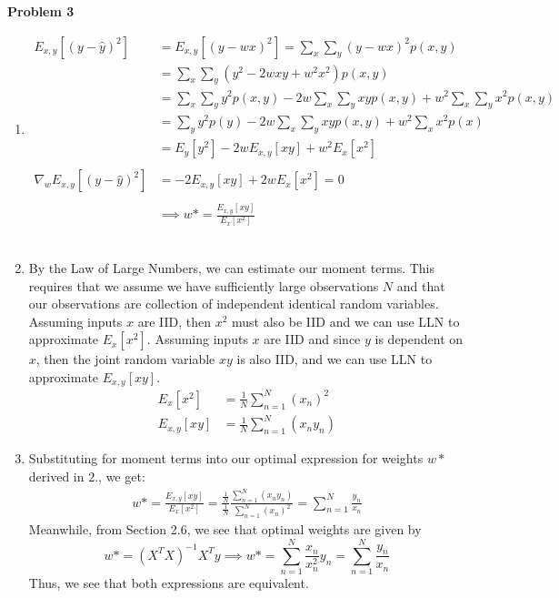 \documentclass[submit]{harvardml}
\begin{document}
\newpage
\textbf{Problem 3}
\begin{enumerate}
    \item 
    \begin{align}
        E_{x,y}[(y-\hat{y})^2] &= E_{x,y}[(y-wx)^2] = \sum_x \sum_y (y - wx)^2 p(x,y) \\
        &=\sum_x \sum_y (y^2 - 2wxy+w^2x^2)p(x,y) \\
        &= \sum_x\sum_y y^2 p(x,y) - 2w\sum_x\sum_y xy p(x,y) +w^2\sum_x\sum_y x^2p(x,y) \\
        &= \sum_y y^2 p(y) - 2w\sum_x\sum_y xy p(x,y) + w^2 \sum_x x^2 p(x) \\
        &= E_y[y^2] - 2wE_{x,y}[xy] + w^2E_x[x^2]  \\ \\
        \nabla_w E_{x,y}[(y-\hat{y})^2] &= -2 E_{x,y}[xy] + 2wE_x[x^2] = 0 \\ \\
        &\implies w* = \frac{E_{x,y}[xy]}{E_x[x^2]}
    \end{align}
    \\
   
    
    \item  By the Law of Large Numbers, we can estimate our moment terms. This requires that we assume we have sufficiently large observations $N$ and that our observations are collection of independent identical random variables. Assuming inputs $x$ are IID, then $x^2$ must also be IID and we can use LLN to approximate $E_x[x^2]$. Assuming inputs $x$ are IID and since $y$ is dependent on $x$, then the joint random variable $xy$ is also IID, and we can use LLN to approximate $E_{x,y}[xy]$. 
    \begin{align}
        E_x[x^2] &= \frac{1}{N}\sum_{n=1}^N (x_n)^2  \\
        E_{x,y}[xy] &= \frac{1}{N} \sum_{n=1}^N (x_n y_n) 
    \end{align}
    
    
    \item  Substituting for moment terms into our optimal expression for weights $w*$ derived in $2.$, we get:
    \begin{align}
        w* = \frac{E_{x,y}[xy]}{E_x[x^2]} = \frac{\frac{1}{N}}{\frac{1}{N}} \frac{\sum_{n=1}^N (x_n y_n)}{\sum_{n=1}^N (x_n)^2} = \sum_{n=1}^N \frac{y_n}{x_n} 
    \end{align}
    Meanwhile, from Section 2.6, we see that optimal weights are given by 
    $$w* = (X^TX)^{-1} X^Ty \implies w* = \sum_{n=1}^N \frac{x_n}{x_n^2}y_n = \sum_{n=1}^N \frac{y_n}{x_n} $$
    Thus, we see that both expressions are equivalent.
    

\end{enumerate}
\end{document}
